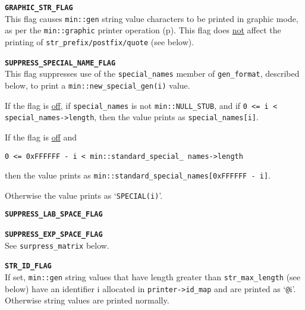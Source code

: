 \documentclass[12pt]{article}
\makeatletter
\newcommand{\TT}[1]{{\tt \bfseries #1}}
\newcommand{\ttkey}[1]{\TT{#1}\index{#1@{\tt #1}}}
\newcommand{\ttmkey}[2]{\TT{#1}\index{#1@{\tt #1}!#2}}
\newcommand{\pagref}[1]{p\pageref{#1}}
\newcommand{\EOL}{\penalty \exhyphenpenalty}
\newenvironment{indpar}[1][0.3in]%
	{\begin{list}{}%
		     {\setlength{\itemsep}{0in}%
		      \setlength{\topsep}{0in}%
		      \setlength{\parsep}{1ex}%
		      \setlength{\labelwidth}{#1}%
		      \setlength{\leftmargin}{#1}%
		      \addtolength{\leftmargin}{\labelsep}}%
	 \item}%
	{\end{list}}
\newenvironment{itemlist}[1][1.2in]%
	{\begin{list}{}{\setlength{\labelwidth}{#1}%
		        \setlength{\leftmargin}{\labelwidth}%
		        \addtolength{\leftmargin}{+0.2in}%
		        \renewcommand{\makelabel}[1]{##1\hfill}}}%
	{\end{list}}
\makeatother
\begin{document}
\begin{indpar}[0.1in]\begin{itemlist}[0.4in]

\item[\ttmkey{GRAPHIC\_STR\_FLAG}{{\tt min::gen\_format} flag}]~\\
This flag causes {\tt min::gen} string value characters to be printed
in graphic mode, as per the {\tt min::graphic} printer operation
(\pagref{MIN::GRAPHIC}).  This flag does \underline{not} affect the
printing of {\tt str\_\EOL pre\-fix/\EOL post\-fix/\EOL quote} (see below).


\item[\ttkey{SUPPRESS\_SPECIAL\_NAME\_FLAG}]~\\
This flag suppresses use of the
{\tt special\_\EOL names} member
of {\tt gen\_\EOL format}, described below, to
print a {\tt min::\EOL new\_\EOL special\_\EOL gen(i)} value.

If the flag is \underline{off}, if {\tt special\_\EOL names}
is not {\tt min::\EOL NULL\_\EOL STUB}, and if
{\tt 0 <= i < special\_\EOL names->\EOL length}, then
the value prints as {\tt special\_\EOL names[i]}.

If the flag is \underline{off} and
\begin{center}
\tt 0 <= 0xFFFFFF\,-\,i\,<\,min::\EOL standard\_\EOL special\_\EOL
names->\EOL length
\end{center}
then the value prints as
{\tt min::\EOL standard\_\EOL special\_\EOL names[0xFFFFFF\,-\,i]}.

Otherwise the value prints as `{\tt SPECIAL(i)}'.

\item[\ttkey{SUPPRESS\_LAB\_SPACE\_FLAG}]
\item[\ttkey{SUPPRESS\_EXP\_SPACE\_FLAG}]\vspace{-1ex}~\\
See {\tt surpress\_matrix} below.


\item[\ttmkey{STR\_ID\_FLAG}{{\tt min::gen\_format} flag}]~\\
If set, {\tt min::gen} string values that have length greater
than {\tt str\_\EOL max\_\EOL length} (see below)
have an identifier i allocated
in {\tt printer->\EOL id\_\EOL map} and are printed as `{\tt @}i'.
Otherwise string values are printed normally.

\end{itemlist}\end{indpar}
\end{document}
